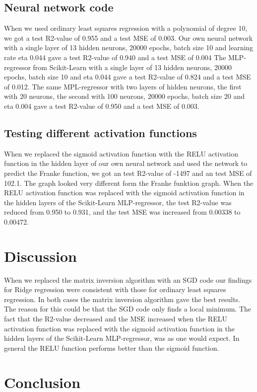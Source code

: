 \documentclass[12pt,a4paper]{article}
\begin{document}
    \subsection{Neural network code}

When we used ordinary least squares regression with a polynomial of degree 10, we got a test R2-value of 0.955 and a test MSE of 0.003.
Our own neural network with a single layer of 13 hidden neurons, 20000 epochs, batch size 10 and learning rate eta 0.044 gave a test R2-value of 0.940 and a test MSE of 0.004
The MLP-regressor from Scikit-Learn with a single layer of 13 hidden neurons, 20000 epochs, batch size 10 and eta 0.044 gave a test R2-value of 0.824 and a test MSE of 0.012.
The same MPL-regressor with two layers of hidden neurons, the first with 20 neurons, the second with 100 neurons, 20000 epochs, batch size 20 and eta 0.004 gave a test R2-value of 0.950 and a test MSE of 0.003.

\subsection{Testing different activation functions}

When we replaced the sigmoid activation function with the RELU activation function in the hidden layer of our own neural network and used the network to predict the Franke function, we got an test R2-value of -1497 and an test MSE of 102.1. The graph looked very different form the Franke funktion graph. When the RELU activation function was replaced with the sigmoid activation function in the hidden layers of the Scikit-Learn MLP-regressor, the test R2-value was reduced from 0.950 to 0.931, and the test MSE was increased from 0.00338 to 0.00472.

\section{Discussion}
When we replaced the matrix inversion algorithm with an SGD code our findings for Ridge regression were consistent with those for ordinary least squares regression. In both cases the matrix inversion algorithm gave the best results. The reason for this could be that the SGD code only finds a local minimum.
The fact that the R2-value decreased and the MSE increased when the RELU activation function was replaced with the sigmoid activation function in the hidden layers of the Scikit-Learn MLP-regressor, was as one would expect. In general the RELU function performs better than the sigmoid function.

\section{Conclusion}






\end{document}
